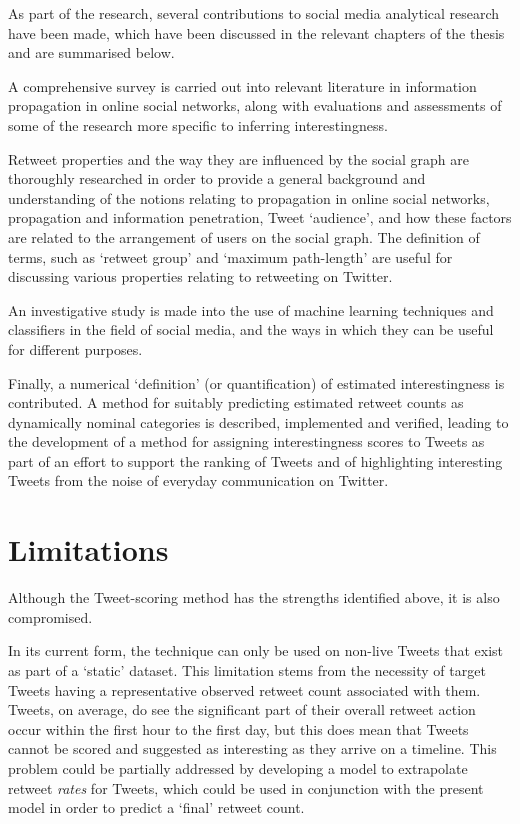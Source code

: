As part of the research, several contributions to social media analytical research have been made, which have been discussed in the relevant chapters of the thesis and are summarised below. 

A comprehensive survey is carried out into relevant literature in information propagation in online social networks, along with evaluations and assessments of some of the research more specific to inferring interestingness.

Retweet properties and the way they are influenced by the social graph are thoroughly researched in order to provide a general background and understanding of the notions relating to propagation in online social networks, propagation and information penetration, Tweet `audience', and how these factors are related to the arrangement of users on the social graph. The definition of terms, such as `retweet group' and `maximum path-length' are useful for discussing various properties relating to retweeting on Twitter.

An investigative study is made into the use of machine learning techniques and classifiers in the field of social media, and the ways in which they can be useful for different purposes.

Finally, a numerical `definition' (or quantification) of estimated interestingness is contributed. A method for suitably predicting estimated retweet counts as dynamically nominal categories is described, implemented and verified, leading to the development of a method for assigning interestingness scores to Tweets as part of an effort to support the ranking of Tweets and of highlighting interesting Tweets from the noise of everyday communication on Twitter.

\section{Limitations}
Although the Tweet-scoring method has the strengths identified above, it is also compromised.

In its current form, the technique can only be used on non-live Tweets that exist as part of a `static' dataset. This limitation stems from the necessity of target Tweets having a representative observed retweet count associated with them. Tweets, on average, do see the significant part of their overall retweet action occur within the first hour to the first day, but this does mean that Tweets cannot be scored and suggested as interesting as they arrive on a timeline. This problem could be partially addressed by developing a model to extrapolate retweet \textit{rates} for Tweets, which could be used in conjunction with the present model in order to predict a `final' retweet count. 

